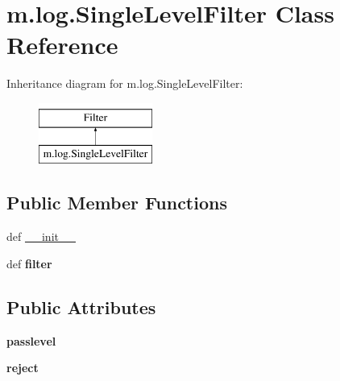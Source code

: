 \hypertarget{classm_1_1log_1_1_single_level_filter}{\section{m.\-log.\-Single\-Level\-Filter Class Reference}
\label{classm_1_1log_1_1_single_level_filter}
}
Inheritance diagram for m.\-log.\-Single\-Level\-Filter\-:\begin{figure}[H]
\begin{center}
\leavevmode
\includegraphics[height=2.000000cm]{classm_1_1log_1_1_single_level_filter}
\end{center}
\end{figure}
\subsection*{Public Member Functions}
\begin{DoxyCompactItemize}
\item 
def \hyperlink{classm_1_1log_1_1_single_level_filter_a0d9e04941fa9c8c37e6d49a2a38cc7e0}{\-\_\-\-\_\-init\-\_\-\-\_\-}
\item 
\hypertarget{classm_1_1log_1_1_single_level_filter_a3ce80a8d0dfa75d538291299dfa9c929}{def {\bfseries filter}}\label{classm_1_1log_1_1_single_level_filter_a3ce80a8d0dfa75d538291299dfa9c929}

\end{DoxyCompactItemize}
\subsection*{Public Attributes}
\begin{DoxyCompactItemize}
\item 
\hypertarget{classm_1_1log_1_1_single_level_filter_ace7b691dfece2684f31ef1843cee6120}{{\bfseries passlevel}}\label{classm_1_1log_1_1_single_level_filter_ace7b691dfece2684f31ef1843cee6120}

\item 
\hypertarget{classm_1_1log_1_1_single_level_filter_a0d2c89b31ff79eff990febd51be3c127}{{\bfseries reject}}\label{classm_1_1log_1_1_single_level_filter_a0d2c89b31ff79eff990febd51be3c127}

\end{DoxyCompactItemize}


